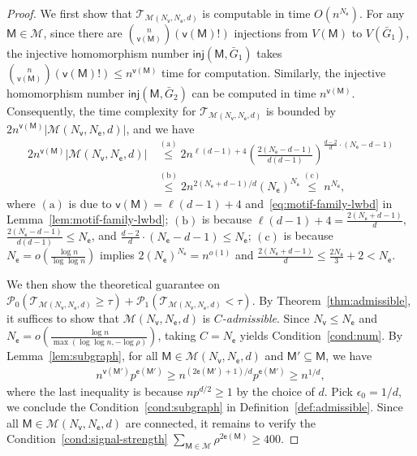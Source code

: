 \documentclass[letterpaper,11pt]{article}
\theoremstyle{definition}
\newcommand{\maM}{\mathcal{M}}
\newcommand{\maP}{\mathcal{P}}
\newcommand{\maT}{\mathcal{T}}
\newcommand{\en}{\mathsf{{e}}}
\newcommand{\vn}{\mathsf{{v}}}
\newcommand{\pth}[1]{\left( #1 \right)}
\newcommand{\sfM}{{\mathsf{M}}}
\newcommand{\sfe}{{\mathsf{e}}}
\newcommand{\sfv}{{\mathsf{v}}}
\newcommand{\inj}{\mathsf{inj}}
\begin{document}
\begin{proof}
We first show that $\maT_{\maM(N_\sfv,N_\sfe,d)}$ is computable in time $O(n^{N_\sfe})$. For any $\sfM\in \maM$, since there are $\binom{n}{\vn(\sfM)}(\vn(\sfM)!)$ injections from $V(\sfM)$ to $V(\bar{G}_1)$,
the injective homomorphism number $\inj(\sfM,\bar{G}_1)$ takes $\binom{n}{\vn(\sfM)}(\vn(\sfM)!)\le n^{\vn(\sfM)}$ time for computation. Similarly, the injective homomorphism number $\inj(\sfM,\bar{G}_2)$ can be computed in time $n^{\vn(\sfM)}$. Consequently, the time complexity for ${\maT_{\maM(N_\sfv,N_\sfe,d)}}$ is bounded by $2n^{\vn(\sfM)} |{\maM(N_\sfv,N_\sfe,d)}|$, and we have \begin{align*}
    2n^{\vn(\sfM)} |{\maM(N_\sfv,N_\sfe,d)}|&\overset{\mathrm{(a)}}{\le} 2n^{\ell(d-1)+4} \pth{\frac{2(N_\sfe-d-1)}{d(d-1)}}^{\frac{d-2}{d}\cdot (N_\sfe-d-1)}\\&\overset{\mathrm{(b)}}{\le} 2n^{2(N_\sfe+d-1)/d}(N_\sfe)^{N_\sfe}\overset{\mathrm{(c)}}{\le} n^{N_\sfe},
\end{align*}
where $\mathrm{(a)}$ is due to $\vn(\sfM)=\ell(d-1)+4$ and~\eqref{eq:motif-family-lwbd} in Lemma~\ref{lem:motif-family-lwbd}; $\mathrm{(b)}$ is because $\ell(d-1)+4 = \frac{2(N_\sfe+d-1)}{d}$, $\frac{2(N_\sfe-d-1)}{d(d-1)}\le N_\sfe$, and $\frac{d-2}{d}\cdot (N_\sfe-d-1)\le N_\sfe$; $\mathrm{(c)}$ is because $N_\sfe = o(\frac{\log n}{\log \log n})$ implies $2(N_\sfe)^{N_\sfe} = n^{o(1)}$ and $\frac{2(N_\sfe+d-1)}{d}\le \frac{2N_\sfe}{3}+2<N_\sfe$.

We then show the theoretical guarantee on $\maP_0\pth{\maT_{\maM(N_\sfv,N_\sfe,d)}\ge \tau}+\maP_1\pth{\maT_{\maM(N_\sfv,N_\sfe,d)}< \tau}$. By Theorem~\ref{thm:admissible}, it suffices to show that $\maM(N_\sfv,N_\sfe,d)$ is \emph{$C$-admissible}. Since $N_\sfv\le N_\sfe$ and $N_\sfe = o\pth{\frac{\log n}{\max \pth{\log \log n, -\log \rho}}}$, taking $C = N_\sfe$ yields Condition~\ref{cond:num}. By Lemma~\ref{lem:subgraph}, for all $\sfM\in \maM(N_\sfv,N_\sfe,d)$ and $\sfM'\subseteq \sfM$, we have \begin{align*}
    n^{\vn(\sfM')}p^{\en(\sfM')}\ge n^{(2\en(\sfM')+1)/d}p^{\en(\sfM')}\ge n^{1/d},
\end{align*}
where the last inequality is because $np^{d/2}\ge 1$ by the choice of $d$. Pick $\epsilon_0 = 1/d$, we conclude the Condition~\ref{cond:subgraph} in Definition~\ref{def:admissible}. Since all $\sfM\in \maM(N_\sfv,N_\sfe,d)$ are connected, it remains to verify the Condition~\ref{cond:signal-strength} $\sum_{\sfM\in \maM}\rho^{2\en(\sfM)}\ge 400$.


\end{proof}
\end{document}
